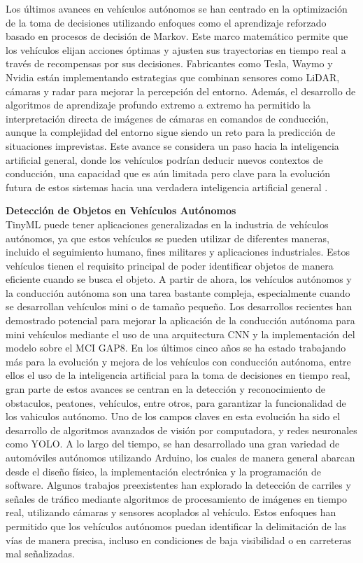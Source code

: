 Los últimos avances en vehículos autónomos se han centrado en la optimización de la toma de decisiones utilizando enfoques como el aprendizaje reforzado basado en procesos de decisión de Markov. Este marco matemático permite que los vehículos elijan acciones óptimas y ajusten sus trayectorias en tiempo real a través de recompensas por sus decisiones. Fabricantes como Tesla, Waymo y Nvidia están implementando estrategias que combinan sensores como LiDAR, cámaras y radar para mejorar la percepción del entorno. Además, el desarrollo de algoritmos de aprendizaje profundo extremo a extremo ha permitido la interpretación directa de imágenes de cámaras en comandos de conducción, aunque la complejidad del entorno sigue siendo un reto para la predicción de situaciones imprevistas. Este avance se considera un paso hacia la inteligencia artificial general, donde los vehículos podrían deducir nuevos contextos de conducción, una capacidad que es aún limitada pero clave para la evolución futura de estos sistemas hacia una verdadera inteligencia artificial general \cite{mlearninglabAvances}.

\textbf{Detección de Objetos en Vehículos Autónomos} 
\\
TinyML puede tener aplicaciones generalizadas en la industria de vehículos autónomos, ya que estos vehículos se pueden utilizar de diferentes maneras, incluido el seguimiento humano, fines militares y aplicaciones industriales. Estos vehículos tienen el requisito principal de poder identificar objetos de manera eficiente cuando se busca el objeto. 
A partir de ahora, los vehículos autónomos y la conducción autónoma son una tarea bastante compleja, especialmente cuando se desarrollan vehículos mini o de tamaño pequeño. Los desarrollos recientes han demostrado potencial para mejorar la aplicación de la conducción autónoma para mini vehículos mediante el uso de una arquitectura CNN y la implementación del modelo sobre el MCI GAP8. 
En los últimos cinco años se ha estado trabajando más para la evolución y mejora de los vehículos con conducción autónoma, entre ellos el uso de la inteligencia artificial para la toma de decisiones en tiempo real, gran parte de estos avances se centran en la detección y reconocimiento de obstaculos, peatones, vehículos, entre otros, para garantizar la funcionalidad de los vahiculos autónomo.
Uno de los campos claves en esta evolución ha sido el desarrollo de algoritmos avanzados de visión por computadora, y redes neuronales como YOLO.  
A lo largo del tiempo, se han desarrollado una gran variedad de automóviles autónomos utilizando Arduino, los cuales de manera general abarcan desde el diseño físico, la implementación electrónica y la programación de software. Algunos trabajos preexistentes han explorado la detección de carriles y señales de tráfico mediante algoritmos de procesamiento de imágenes en tiempo real, utilizando cámaras y sensores acoplados al vehículo. Estos enfoques han permitido que los vehículos autónomos puedan identificar la delimitación de las vías de manera precisa, incluso en condiciones de baja visibilidad o en carreteras mal señalizadas.


